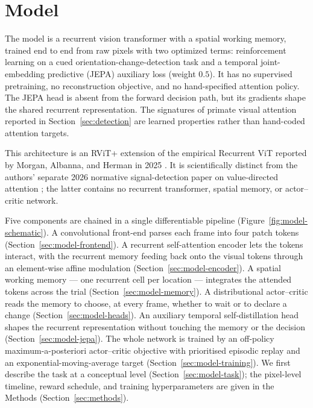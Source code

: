 
\section{Model}
\label{sec:model}

The model is a recurrent vision transformer with a spatial working
memory, trained end to end from raw pixels with two optimized terms:
reinforcement learning on a cued orientation-change-detection task and a
temporal joint-embedding predictive (JEPA) auxiliary loss (weight $0.5$). It has no
supervised pretraining, no reconstruction objective, and no hand-specified
attention policy. The JEPA head is absent from the forward decision path,
but its gradients shape the shared recurrent representation. The signatures
of primate visual attention reported in Section~\ref{sec:detection} are
learned properties rather than hand-coded attention targets.

This architecture is an RViT+ extension of the empirical Recurrent ViT reported by
Morgan, Albanna, and Herman in 2025 \cite{morgan_albanna_herman2025_rvit}. It is
scientifically distinct from the authors' separate 2026 normative signal-detection
paper on value-directed attention \cite{morgan_albanna_herman2026_vda}; the latter
contains no recurrent transformer, spatial memory, or actor--critic network.

Five components are chained in a single differentiable pipeline
(Figure~\ref{fig:model-schematic}). A convolutional front-end parses each
frame into four patch tokens (Section~\ref{sec:model-frontend}). A
recurrent self-attention encoder lets the tokens interact, with the
recurrent memory feeding back onto the visual tokens through an
element-wise affine modulation (Section~\ref{sec:model-encoder}). A
spatial working memory --- one recurrent cell per location --- integrates
the attended tokens across the trial (Section~\ref{sec:model-memory}). A
distributional actor--critic reads the memory to choose, at every frame,
whether to wait or to declare a change (Section~\ref{sec:model-heads}).
An auxiliary temporal self-distillation head shapes the recurrent
representation without touching the memory or the decision
(Section~\ref{sec:model-jepa}). The whole network is trained by an
off-policy maximum-a-posteriori actor--critic objective with prioritised
episodic replay and an exponential-moving-average target
(Section~\ref{sec:model-training}). We first describe the task at a
conceptual level (Section~\ref{sec:model-task}); the pixel-level
timeline, reward schedule, and training hyperparameters are given in the
Methods (Section~\ref{sec:methods}).


